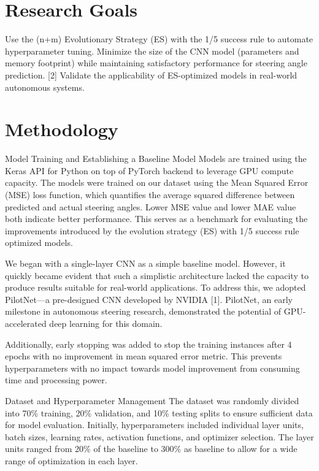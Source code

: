 \documentclass[conference]{IEEEtran}
\begin{document}
\section{Research Goals}
Use the (n+m) Evolutionary Strategy (ES) with the 1/5 success rule to automate hyperparameter tuning.
Minimize the size of the CNN model (parameters and memory footprint) while maintaining satisfactory performance for steering angle prediction. [2]
Validate the applicability of ES-optimized models in real-world autonomous systems.

\section{Methodology}

Model Training and Establishing a Baseline Model
Models are trained using the Keras API for Python on top of PyTorch backend to leverage GPU compute capacity. The models were trained on our dataset using the Mean Squared Error (MSE) loss function, which quantifies the average squared difference between predicted and actual steering angles. Lower MSE value and lower MAE value both indicate better performance. This serves as a benchmark for evaluating the improvements introduced by the evolution strategy (ES) with 1/5 success rule optimized models.

We began with a single-layer CNN as a simple baseline model. However, it quickly became evident that such a simplistic architecture lacked the capacity to produce results suitable for real-world applications. To address this, we adopted PilotNet—a pre-designed CNN developed by NVIDIA [1]. PilotNet, an early milestone in autonomous steering research, demonstrated the potential of GPU-accelerated deep learning for this domain.

Additionally, early stopping was added to stop the training instances after 4 epochs with no improvement in mean squared error metric. This prevents hyperparameters with no impact towards model improvement from consuming time and processing power.

Dataset and Hyperparameter Management
The dataset was randomly divided into 70\% training, 20\% validation, and 10\% testing splits to ensure sufficient data for model evaluation. Initially, hyperparameters included individual layer units, batch sizes, learning rates, activation functions, and optimizer selection. The layer units ranged from 20\% of the baseline to 300\% as baseline to allow for a wide range of optimization in each layer.
\end{document}
